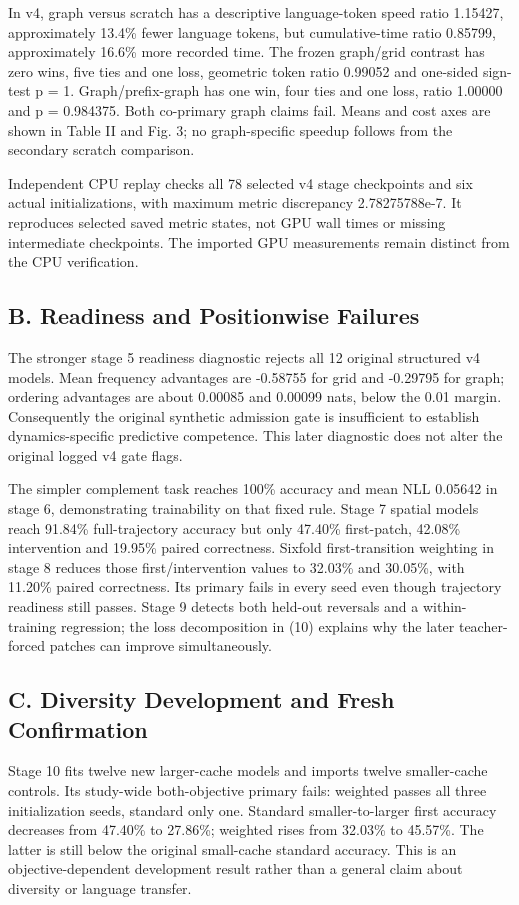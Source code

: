 \documentclass[10pt,letterpaper,twocolumn]{article}
\begin{document}
In v4, graph versus scratch has a descriptive language-token speed ratio 1.15427, approximately 13.4\% fewer language tokens, but cumulative-time ratio 0.85799, approximately 16.6\% more recorded time. The frozen graph/\allowbreak{}grid contrast has zero wins, five ties and one loss, geometric token ratio 0.99052 and one-sided sign-test p = 1. Graph/\allowbreak{}prefix-graph has one win, four ties and one loss, ratio 1.00000 and p = 0.984375. Both co-primary graph claims fail. Means and cost axes are shown in Table II and Fig. 3; no graph-specific speedup follows from the secondary scratch comparison.

Independent CPU replay checks all 78 selected v4 stage checkpoints and six actual initializations, with maximum metric discrepancy 2.78275788e-7. It reproduces selected saved metric states, not GPU wall times or missing intermediate checkpoints. The imported GPU measurements remain distinct from the CPU verification.

\subsection*{B. Readiness and Positionwise Failures}
The stronger stage 5 readiness diagnostic rejects all 12 original structured v4 models. Mean frequency advantages are -0.58755 for grid and -0.29795 for graph; ordering advantages are about 0.00085 and 0.00099 nats, below the 0.01 margin. Consequently the original synthetic admission gate is insufficient to establish dynamics-specific predictive competence. This later diagnostic does not alter the original logged v4 gate flags.

The simpler complement task reaches 100\% accuracy and mean NLL 0.05642 in stage 6, demonstrating trainability on that fixed rule. Stage 7 spatial models reach 91.84\% full-trajectory accuracy but only 47.40\% first-patch, 42.08\% intervention and 19.95\% paired correctness. Sixfold first-transition weighting in stage 8 reduces those first/\allowbreak{}intervention values to 32.03\% and 30.05\%, with 11.20\% paired correctness. Its primary fails in every seed even though trajectory readiness still passes. Stage 9 detects both held-out reversals and a within-training regression; the loss decomposition in (10) explains why the later teacher-forced patches can improve simultaneously.

\subsection*{C. Diversity Development and Fresh Confirmation}
Stage 10 fits twelve new larger-cache models and imports twelve smaller-cache controls. Its study-wide both-objective primary fails: weighted passes all three initialization seeds, standard only one. Standard smaller-to-larger first accuracy decreases from 47.40\% to 27.86\%; weighted rises from 32.03\% to 45.57\%. The latter is still below the original small-cache standard accuracy. This is an objective-dependent development result rather than a general claim about diversity or language transfer.
\end{document}
